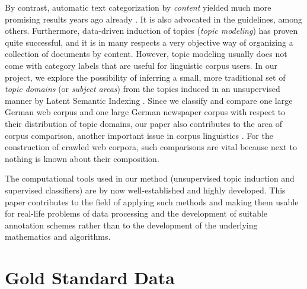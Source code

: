 \documentclass[11pt]{article}
\begin{document}
By contrast, automatic text categorization by \textit{content} yielded much more promising results years ago already \cite{Sebastiani2002}.
It is also advocated in the  guidelines, among others.
Furthermore, data-driven induction of topics (\textit{topic modeling}) has proven quite successful, and it is in many respects a very objective way of organizing a collection of documents by content.
However, topic modeling usually does not come with category labels that are useful for linguistic corpus users.
In our project, we explore the possibility of inferring a small, more traditional set of \textit{topic domains} (or \textit{subject areas}) from the topics induced in an unsupervised manner by Latent Semantic Indexing \cite{LandauerDumais1994,LandauerDumais1997}.
Since we classify and compare one large German web corpus and one large German newspaper corpus with respect to their distribution of topic domains, our paper also contributes to the area of corpus comparison, another important issue in corpus linguistics \cite{Kilgarriff2001,BiemannEa2013}.
For the construction of crawled web corpora, such comparisons are vital because next to nothing is known about their composition.

The computational tools used in our method (unsupervised topic induction and supervised classifiers) are by now well-established and highly developed.
This paper contributes to the field of applying such methods and making them usable for real-life problems of data processing and the development of suitable annotation schemes rather than to the development of the underlying mathematics and algorithms.

\section{Gold Standard Data}
\label{sec:goldstandard}
\end{document}
